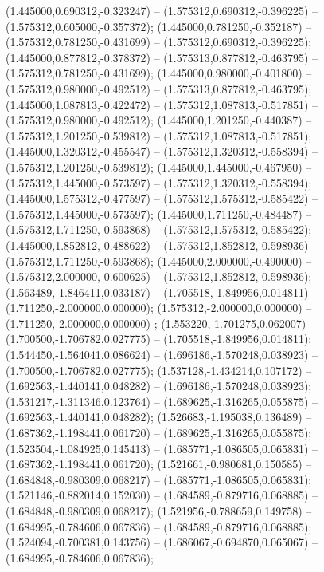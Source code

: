  (1.445000,0.690312,-0.323247) -- (1.575312,0.690312,-0.396225) -- (1.575312,0.605000,-0.357372);
 (1.445000,0.781250,-0.352187) -- (1.575312,0.781250,-0.431699) -- (1.575312,0.690312,-0.396225);
 (1.445000,0.877812,-0.378372) -- (1.575313,0.877812,-0.463795) -- (1.575312,0.781250,-0.431699);
 (1.445000,0.980000,-0.401800) -- (1.575312,0.980000,-0.492512) -- (1.575313,0.877812,-0.463795);
 (1.445000,1.087813,-0.422472) -- (1.575312,1.087813,-0.517851) -- (1.575312,0.980000,-0.492512);
 (1.445000,1.201250,-0.440387) -- (1.575312,1.201250,-0.539812) -- (1.575312,1.087813,-0.517851);
 (1.445000,1.320312,-0.455547) -- (1.575312,1.320312,-0.558394) -- (1.575312,1.201250,-0.539812);
 (1.445000,1.445000,-0.467950) -- (1.575312,1.445000,-0.573597) -- (1.575312,1.320312,-0.558394);
 (1.445000,1.575312,-0.477597) -- (1.575312,1.575312,-0.585422) -- (1.575312,1.445000,-0.573597);
 (1.445000,1.711250,-0.484487) -- (1.575312,1.711250,-0.593868) -- (1.575312,1.575312,-0.585422);
 (1.445000,1.852812,-0.488622) -- (1.575312,1.852812,-0.598936) -- (1.575312,1.711250,-0.593868);
 (1.445000,2.000000,-0.490000) -- (1.575312,2.000000,-0.600625) -- (1.575312,1.852812,-0.598936);
 (1.563489,-1.846411,0.033187) -- (1.705518,-1.849956,0.014811) -- (1.711250,-2.000000,0.000000);
 (1.575312,-2.000000,0.000000) -- (1.711250,-2.000000,0.000000) ;
 (1.553220,-1.701275,0.062007) -- (1.700500,-1.706782,0.027775) -- (1.705518,-1.849956,0.014811);
 (1.544450,-1.564041,0.086624) -- (1.696186,-1.570248,0.038923) -- (1.700500,-1.706782,0.027775);
 (1.537128,-1.434214,0.107172) -- (1.692563,-1.440141,0.048282) -- (1.696186,-1.570248,0.038923);
 (1.531217,-1.311346,0.123764) -- (1.689625,-1.316265,0.055875) -- (1.692563,-1.440141,0.048282);
 (1.526683,-1.195038,0.136489) -- (1.687362,-1.198441,0.061720) -- (1.689625,-1.316265,0.055875);
 (1.523504,-1.084925,0.145413) -- (1.685771,-1.086505,0.065831) -- (1.687362,-1.198441,0.061720);
 (1.521661,-0.980681,0.150585) -- (1.684848,-0.980309,0.068217) -- (1.685771,-1.086505,0.065831);
 (1.521146,-0.882014,0.152030) -- (1.684589,-0.879716,0.068885) -- (1.684848,-0.980309,0.068217);
 (1.521956,-0.788659,0.149758) -- (1.684995,-0.784606,0.067836) -- (1.684589,-0.879716,0.068885);
 (1.524094,-0.700381,0.143756) -- (1.686067,-0.694870,0.065067) -- (1.684995,-0.784606,0.067836);
